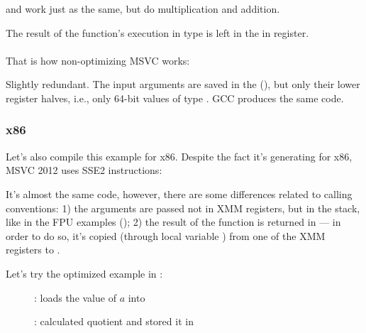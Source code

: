 and  work just as the same, but do multiplication and addition.

The result of the function's execution in type \Tdouble is left in the in  register.\\
\\
That is how non-optimizing MSVC works:



Slightly redundant. 
The input arguments are saved in the  (), 
but only their lower register halves, i.e., only 64-bit values of type \Tdouble.
GCC produces the same code.

\subsubsection{x86}

Let's also compile this example for x86. Despite the fact it's generating for x86, MSVC 2012 uses SSE2 instructions:





It's almost the same code, however, there are some differences related to calling conventions:
1) the arguments are passed not in XMM registers, but in the stack, like in the FPU examples ();
2) the result of the function is returned in  --- in order to do so, it's copied
(through local variable ) from one of the XMM registers to .

\clearpage
Let's try the optimized example in \olly:

\begin{figure}[H]
\centering
{}
\caption{\olly:  loads the value of $a$ into }
\label{fig:FPU_SIMD_simple_olly1}
\end{figure}

\clearpage
\begin{figure}[H]
\centering
{}
\caption{\olly:  calculated \gls{quotient} 
and stored it in }
\label{fig:FPU_SIMD_simple_olly2}
\end{figure}

